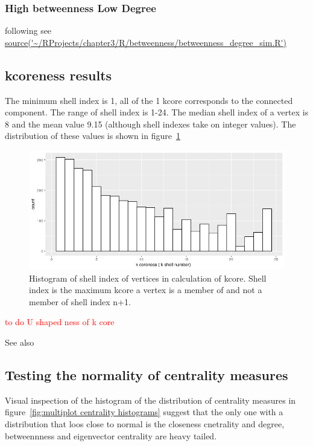 \subsubsection{High betweenness Low Degree}
following \cite{joy2005high} see \url{source('~/RProjects/chapter3/R/betweenness/betweenness_degree_sim.R')}
\subsection{kcoreness results}
 The minimum shell index is 1, all of the 1 kcore corresponds to the connected component. The range of shell index is 1-24. The median shell index of a vertex is 8 and the mean value 9.15 (although shell indexes take on integer values). The distribution of these values is shown in figure~\ref{fig:Kcore_histogram}
 
 \begin{figure}
     \centering
     \includegraphics[width=\textwidth]{images/Rplot01_kcore_hist.png}
     \caption{Histogram of shell index of vertices in calculation of kcore. Shell index is the maximum kcore a vertex is a member of and not a member of shell index n+1. }
     \label{fig:Kcore_histogram}
 \end{figure}
 
 \textcolor{red}{to do U shaped ness of k core}\cite{burleson2020k} 
 
 See also \cite{dorogovtsev2006k}
\subsection{Testing the normality of centrality measures}

Visual inspection of the histogram of the distribution of centrality measures in figure~\ref{fig:multiplot centrality histograms} suggest that the only one with a distribution that loos close to normal is the closeness cnetrality and degree, betweennness and eigenvector centrality are heavy tailed. 

